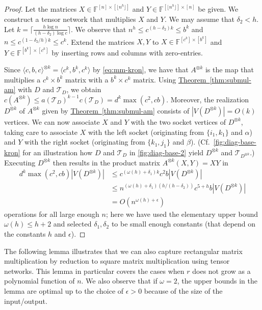 \documentclass[11pt]{article}
\numberwithin{equation}{section}
\theoremstyle{definition}
\theoremstyle{plain}
\newcommand{\expref}[2]{\hyperref[#2]{#1~\ref{#2}}}
\newcommand{\bra}{\ensuremath{\langle}}
\newcommand{\ket}{\ensuremath{\rangle}}
\newcommand{\F}{\ensuremath{\mathbb{F}}}
\newcommand{\td}{\ensuremath{\mathcal{T}_D}}
\newcommand{\tdk}{\ensuremath{\mathcal{T}_{D^{\otimes k}}}}
\begin{document}
\begin{proof}
Let the matrices $X\in\F^{[n]\times[\lfloor n^h\rfloor]}$
and $Y\in\F^{[\lfloor n^h\rfloor]\times[n]}$ be given. We construct
a tensor network that multiplies $X$ and $Y$.
We may assume that $\delta_2<h$.
Let $k=\lceil\frac{h\log n}{(h-\delta_2)\log c}\rceil$.
We observe that $n^h\leq c^{(h-\delta_2)k}\leq b^k$
and $n\leq c^{(1-\delta_2/h)k}\leq c^k$.
Extend the matrices $X,Y$ to $X\in\F^{[c^k]\times [b^k]}$ and
$Y\in\F^{[b^k]\times [c^k]}$ by inserting rows and columns with
zero-entries.

Since $\bra c,b,c\ket^{\otimes k}=\bra c^k,b^k,c^k\ket$ by
\eqref{eq:mm-kron}, we have that $A^{\otimes k}$ is the map that
multiplies a $c^k\times b^k$ matrix with a $b^k\times c^k$ matrix.
Using \expref{Theorem}{thm:submul-am} with $D$ and $\td$, we obtain
$c(A^{\otimes k})\leq a(\td)^{k-1}c(\td)=d^{k}\max(c^2,cb)$.
Moreover, the realization $D^{\otimes k}$ of $A^{\otimes k}$
given by \expref{Theorem}{thm:submul-am} consists of
$|V(D^{\otimes k})|=O(k)$ vertices.
We can now associate $X$ and $Y$ with the
two socket vertices of $D^{\otimes k}$, taking care to
associate $X$ with the left socket (originating from $\{i_1,k_1\}$ and $\alpha$)
and $Y$ with the right socket (originating from $\{k_1,j_1\}$ and $\beta$).
(Cf.~\eqref{fig:diag-base-kron} for an illustration how $D$ and $\td$
in \eqref{fig:diag-base-2} yield $D^{\otimes k}$ and $\tdk$.)
Executing $D^{\otimes k}$ then results in the product matrix
$A^{\otimes k}(X,Y)=XY$ in
\[
\begin{split}
d^{k}\max(c^2,cb)|V(D^{\otimes k})|
 &\leq c^{(\omega(h)+\delta_1)k}c^2b|V(D^{\otimes k})| \\
 &\leq n^{(\omega(h)+\delta_1)(h/(h-\delta_2))}c^{5+h}b|V(D^{\otimes k})| \\
 &=O(n^{\omega(h)+\epsilon})
\end{split}
\]
operations for all large enough $n$; here we have used the elementary
upper bound $\omega(h)\leq h+2$ and selected $\delta_1,\delta_2$ to be
small enough constants (that depend on the constants $h$ and $\epsilon$).
\end{proof}

The following lemma illustrates that we can also capture rectangular matrix
multiplication by reduction to square matrix multiplication using tensor
networks. This lemma in particular covers the cases when $r$ does not grow
as a polynomial function of $n$. We also observe that if $\omega=2$, the upper
bounds in the lemma are optimal up to the choice of $\epsilon>0$ because of
the size of the input/output.
\end{document}

